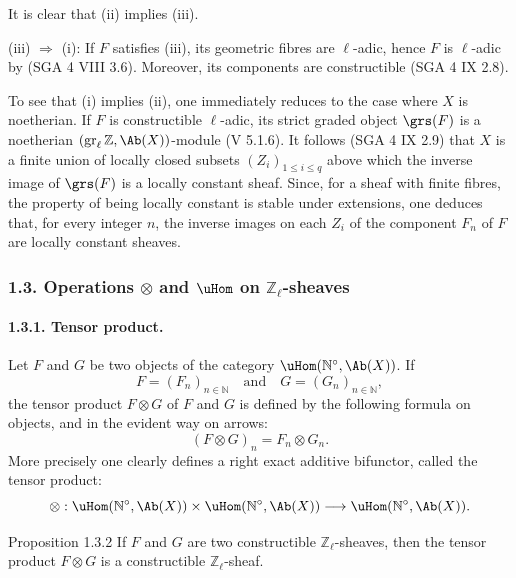 \begin{prooftext}[Proof]
It is clear that (ii) implies (iii).

(iii) \(\Longrightarrow\) (i): If \(F\) satisfies (iii), its geometric fibres are \(\ell\)-adic, hence \(F\) is \(\ell\)-adic by (SGA 4 VIII 3.6). Moreover, its components are constructible (SGA 4 IX 2.8).

To see that (i) implies (ii), one immediately reduces to the case where \(X\) is noetherian. If \(F\) is constructible \(\ell\)-adic, its strict graded object \(\grs(F)\) is a noetherian \((\operatorname{gr}_\ell\mathbb Z,\Ab(X))\)-module (V 5.1.6). It follows (SGA 4 IX 2.9) that \(X\) is a finite union of locally closed subsets \((Z_i)_{1\le i\le q}\) above which the inverse image of \(\grs(F)\) is a locally constant sheaf. Since, for a sheaf with finite fibres, the property of being locally constant is stable under extensions, one deduces that, for every integer \(n\), the inverse images on each \(Z_i\) of the component \(F_n\) of \(F\) are locally constant sheaves.
\end{prooftext}

\subsubsection*{1.3. Operations \(\otimes\) and \(\uHom\) on \(\mathbb Z_\ell\)-sheaves}

\paragraph{1.3.1. Tensor product.}
Let \(F\) and \(G\) be two objects of the category \(\uHom(\mathbb N^\circ,\Ab(X))\). If
\[
F=(F_n)_{n\in\mathbb N}\quad\text{and}\quad G=(G_n)_{n\in\mathbb N},
\]
the tensor product \(F\otimes G\) of \(F\) and \(G\) is defined by the following formula on objects, and in the evident way on arrows:
\[
(F\otimes G)_n=F_n\otimes G_n.
\]
More precisely one clearly defines a right exact additive bifunctor, called the tensor product:
\[
\otimes:\uHom(\mathbb N^\circ,\Ab(X))\times \uHom(\mathbb N^\circ,\Ab(X))
\longrightarrow \uHom(\mathbb N^\circ,\Ab(X)).
\]

\begin{statement}{Proposition 1.3.2}
If \(F\) and \(G\) are two constructible \(\mathbb Z_\ell\)-sheaves, then the tensor product \(F\otimes G\) is a constructible \(\mathbb Z_\ell\)-sheaf.
\end{statement}

